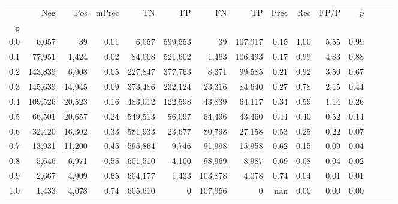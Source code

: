 \begin{tabular}{rrrrrrrrrrrrrrr}
\toprule
{} &      Neg &     Pos & mPrec &       TN &       FP &       FN &       TP &  Prec &   Rec &  FP/P & $\hat{p}$ \\
p   &          &         &       &          &          &          &          &       &       &       &           \\
\midrule
0.0 &    6,057 &      39 &  0.01 &    6,057 &  599,553 &       39 &  107,917 &  0.15 &  1.00 &  5.55 &      0.99 \\
0.1 &   77,951 &   1,424 &  0.02 &   84,008 &  521,602 &    1,463 &  106,493 &  0.17 &  0.99 &  4.83 &      0.88 \\
0.2 &  143,839 &   6,908 &  0.05 &  227,847 &  377,763 &    8,371 &   99,585 &  0.21 &  0.92 &  3.50 &      0.67 \\
0.3 &  145,639 &  14,945 &  0.09 &  373,486 &  232,124 &   23,316 &   84,640 &  0.27 &  0.78 &  2.15 &      0.44 \\
0.4 &  109,526 &  20,523 &  0.16 &  483,012 &  122,598 &   43,839 &   64,117 &  0.34 &  0.59 &  1.14 &      0.26 \\
0.5 &   66,501 &  20,657 &  0.24 &  549,513 &   56,097 &   64,496 &   43,460 &  0.44 &  0.40 &  0.52 &      0.14 \\
0.6 &   32,420 &  16,302 &  0.33 &  581,933 &   23,677 &   80,798 &   27,158 &  0.53 &  0.25 &  0.22 &      0.07 \\
0.7 &   13,931 &  11,200 &  0.45 &  595,864 &    9,746 &   91,998 &   15,958 &  0.62 &  0.15 &  0.09 &      0.04 \\
0.8 &    5,646 &   6,971 &  0.55 &  601,510 &    4,100 &   98,969 &    8,987 &  0.69 &  0.08 &  0.04 &      0.02 \\
0.9 &    2,667 &   4,909 &  0.65 &  604,177 &    1,433 &  103,878 &    4,078 &  0.74 &  0.04 &  0.01 &      0.01 \\
1.0 &    1,433 &   4,078 &  0.74 &  605,610 &        0 &  107,956 &        0 &   nan &  0.00 &  0.00 &      0.00 \\
\bottomrule
\end{tabular}
